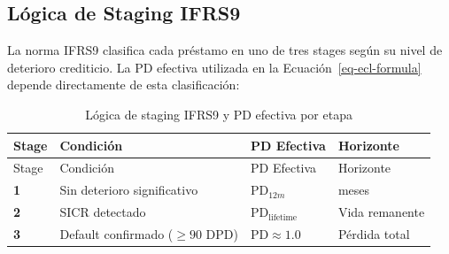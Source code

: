 \documentclass[
  spanish,
  11pt,
  letterpaper,
]{scrbook}
\theoremstyle{plain}
\theoremstyle{remark}
\begin{document}
\subsection{Lógica de Staging IFRS9}\label{luxf3gica-de-staging-ifrs9}

La norma IFRS9 clasifica cada préstamo en uno de tres stages según su
nivel de deterioro crediticio. La PD efectiva utilizada en la
Ecuación~\ref{eq-ecl-formula} depende directamente de esta
clasificación:

\begin{longtable}[]{@{}
  >{\centering\arraybackslash}p{}
  >{\raggedright\arraybackslash}p{}
  >{\raggedright\arraybackslash}p{}
  >{\raggedright\arraybackslash}p{}@{}}
\caption{Lógica de staging IFRS9 y PD efectiva por
etapa}\label{tbl-staging-logic}\tabularnewline
\toprule\noalign{}
\begin{minipage}[b]{\linewidth}\centering
Stage
\end{minipage} & \begin{minipage}[b]{\linewidth}\raggedright
Condición
\end{minipage} & \begin{minipage}[b]{\linewidth}\raggedright
PD Efectiva
\end{minipage} & \begin{minipage}[b]{\linewidth}\raggedright
Horizonte
\end{minipage} \\
\midrule\noalign{}
\endfirsthead
\toprule\noalign{}
\begin{minipage}[b]{\linewidth}\centering
Stage
\end{minipage} & \begin{minipage}[b]{\linewidth}\raggedright
Condición
\end{minipage} & \begin{minipage}[b]{\linewidth}\raggedright
PD Efectiva
\end{minipage} & \begin{minipage}[b]{\linewidth}\raggedright
Horizonte
\end{minipage} \\
\midrule\noalign{}
\endhead
\bottomrule\noalign{}
\endlastfoot
\textbf{1} & Sin deterioro significativo & \(\text{PD}_{12m}\) & 12
meses \\
\textbf{2} & SICR detectado & \(\text{PD}_{\text{lifetime}}\) & Vida
remanente \\
\textbf{3} & Default confirmado (\(\geq 90\) DPD) &
\(\text{PD} \approx 1.0\) & Pérdida total \\
\end{longtable}
\end{document}
